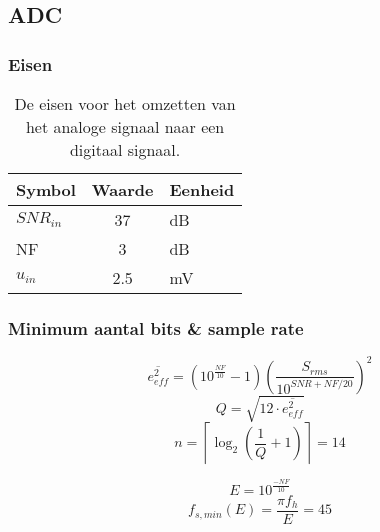     \subsection*{ADC}
    \begin{frame}
        \frametitle{Eisen}
    
        \begin{table}[ht]
    \centering
    \begin{tabular}{l|c|l}
        Symbol      & Waarde & Eenheid\\\hline
        $SNR_{in}$  & 37        & dB\\
        NF          & 3         & dB\\
        $u_{in}$    & 2.5       & mV\\
    \end{tabular}
    \caption{De eisen voor het omzetten van het analoge signaal naar een digitaal signaal.}
    \label{tab:systemSpecADC}
\end{table}
    
    \end{frame}
    \begin{frame}
        \frametitle{Minimum aantal bits \& sample rate}

        \begin{equation}\label{eq:calcSpecifiedRmsError}
            \overline{e_{eff}^2}=\left(10^{\frac{NF}{10}}-1\right)\left(\frac{S_{rms}}{10^{SNR+NF/20}}\right)^2
        \end{equation}
        \begin{equation}\label{eq:calcNeededQ}
            Q=\sqrt{12\cdot\overline{e_{eff}^2}}
        \end{equation}
        \begin{equation}\label{eq:calcMinNumberADCbits}
            n=\left\lceil\log_2\left(\frac{1}{Q}+1\right)\right\rceil=14
        \end{equation}

        \pause
        
        \begin{equation}\label{eq:ADCmaxSampleError}
            E=10^{\frac{-NF}{10}}
        \end{equation}
        \begin{equation}\label{eq:ADCminFs}
            f_{s,min}\left(E\right)=\frac{\pi f_h}{E}=45
        \end{equation}
    
    \end{frame}

